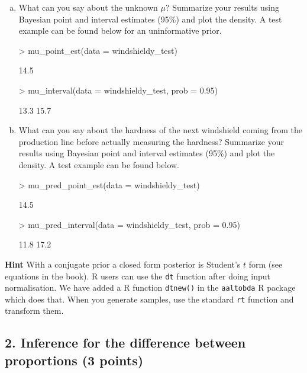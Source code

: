 \documentclass[a4paper,11pt]{article}
\begin{document}
\begin{enumerate}[a)]
\item What can you say about the unknown $\mu$? Summarize your results using Bayesian point and interval estimates (95\%) and plot the density. A test example can be found below for an uninformative prior. 
\begin{Schunk}
\begin{Sinput}
> mu_point_est(data = windshieldy_test)
\end{Sinput}
\begin{Soutput}
[1] 14.5
\end{Soutput}
\begin{Sinput}
> mu_interval(data = windshieldy_test, prob = 0.95)
\end{Sinput}
\begin{Soutput}
[1] 13.3 15.7
\end{Soutput}
\end{Schunk}
\item What can you say about the hardness of the next windshield
  coming from the production line before actually measuring the
  hardness? Summarize your results using Bayesian point and interval estimates (95\%) and plot the density. A test example can be found below.
\begin{Schunk}
\begin{Sinput}
> mu_pred_point_est(data = windshieldy_test)
\end{Sinput}
\begin{Soutput}
[1] 14.5
\end{Soutput}
\begin{Sinput}
> mu_pred_interval(data = windshieldy_test, prob = 0.95)
\end{Sinput}
\begin{Soutput}
[1] 11.8 17.2
\end{Soutput}
\end{Schunk}
\end{enumerate}
\textbf{Hint} With a conjugate prior a closed form posterior is Student's $t$ form (see equations in the book). 
R users can use the {\tt dt} function after doing input normalisation. We have added a R function {\tt dtnew()} in the {\tt aaltobda} R package which does that. When you generate samples, use the standard {\tt rt} function and transform them.


\subsection*{2. Inference for the difference between proportions (3 points)}
\end{document}
